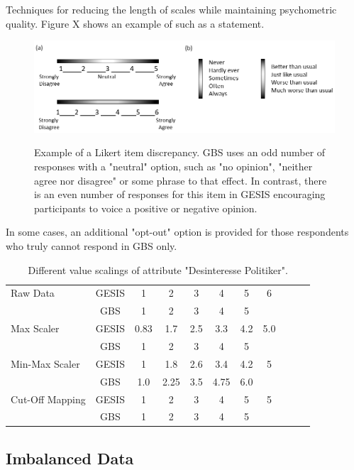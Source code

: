 Techniques for reducing the length of scales while maintaining psychometric quality.
Figure X shows an example of such as a statement.

\begin{figure}[ht]
	\begin{center}
		\includegraphics[scale=0.55,angle=0]{fig/scales}
		\label{6_5}
		\caption{Example of a Likert item discrepancy. GBS uses an odd number of responses with a "neutral" option, such as "no opinion", "neither agree nor disagree" or some phrase to that effect. In contrast, there is an even number of responses for this item in GESIS encouraging participants to voice a positive or negative opinion.}
	\end{center}
\end{figure}

In some cases, an additional "opt-out" option is provided for those respondents who truly cannot respond in GBS only.

\begin{table}[ht]
    \begin{center}
            {\footnotesize
            \begin{tabular}{l|c|ccccccccc}
                \hline \hline
		Raw Data & GESIS & 1 & 2 & 3 & 4 & 5 & 6 \\
                     & GBS & 1 & 2 & 3 & 4 & 5 & \\
                \hline
		Max Scaler & GESIS & 0.83 & 1.7 & 2.5 & 3.3 & 4.2 & 5.0 \\
                     & GBS & 1 & 2 & 3 & 4 & 5 & \\
                \hline
		Min-Max Scaler & GESIS & 1 & 1.8 & 2.6 & 3.4 & 4.2 & 5 \\
                     & GBS & 1.0 & 2.25 & 3.5 & 4.75 & 6.0 & \\
                \hline
		Cut-Off Mapping & GESIS & 1 & 2 & 3 & 4 & 5 & 5 \\
                     & GBS & 1 & 2 & 3 & 4 & 5 & \\
            \end{tabular}}
        \caption{Different value scalings of attribute "Desinteresse Politiker".}
\label{Tab:DescripStatsRawData}
\end{center}
\end{table}

\subsection{Imbalanced Data}
